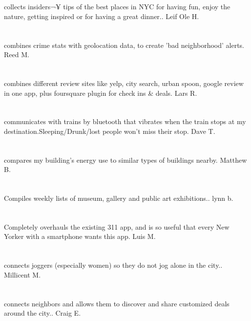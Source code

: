 \section{} collects insiders¬¥ tips of the best places in NYC for having fun,  enjoy the nature,  getting inspired or for having a great dinner.. Leif Ole H.
\section{}combines crime stats with geolocation data,  to create 'bad neighborhood' alerts. Reed M.
\section{}combines different review sites like yelp,  city search,  urban spoon,  google review in one app,  plus foursquare plugin for check ins \& deals. Lars R.
\section{}communicates with trains by bluetooth that vibrates when the train stops at my destination.Sleeping/Drunk/lost people won't miss their stop. Dave T.
\section{}compares my building's energy use to similar types of buildings nearby. Matthew B.
\section{}Compiles weekly  lists of museum,  gallery and public art exhibitions.. lynn b.
\section{} Completely overhauls the existing 311 app,  and is so useful that every New Yorker with a smartphone wants this app. Luis M.
\section{} connects joggers (especially women) so they do not jog alone in the city.. Millicent M.
\section{}connects neighbors and allows them to discover and share customized deals around the city.. Craig E.
